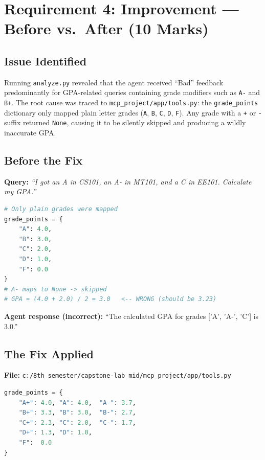 \documentclass[12pt, a4paper]{report}
\begin{document}
\section{Requirement 4: Improvement --- Before vs.\ After (10 Marks)}\label{sec:improvement}

\subsection{Issue Identified}

Running \texttt{analyze.py} revealed that the agent received ``Bad'' feedback predominantly for GPA-related queries containing grade modifiers such as \texttt{A-} and \texttt{B+}. The root cause was traced to \texttt{mcp\_project/app/tools.py}: the \texttt{grade\_points} dictionary only mapped plain letter grades (\texttt{A}, \texttt{B}, \texttt{C}, \texttt{D}, \texttt{F}). Any grade with a \texttt{+} or \texttt{-} suffix returned \texttt{None}, causing it to be silently skipped and producing a wildly inaccurate GPA.

\subsection{Before the Fix}

\textbf{Query:} \textit{``I got an A in CS101, an A- in MT101, and a C in EE101. Calculate my GPA.''}

\begin{lstlisting}[language=Python, caption={Broken grade\_points dictionary --- before fix}]
# Only plain grades were mapped
grade_points = {
    "A": 4.0,
    "B": 3.0,
    "C": 2.0,
    "D": 1.0,
    "F": 0.0
}
# A- maps to None -> skipped
# GPA = (4.0 + 2.0) / 2 = 3.0   <-- WRONG (should be 3.23)
\end{lstlisting}

\noindent\textbf{Agent response (incorrect):} ``The calculated GPA for grades ['A', 'A-', 'C'] is 3.0.''

\subsection{The Fix Applied}

\textbf{File:} \texttt{c:/8th semester/capstone-lab mid/mcp\_project/app/tools.py}

\begin{lstlisting}[language=Python, caption={Corrected grade\_points dictionary --- after fix}]
grade_points = {
    "A+": 4.0, "A": 4.0,  "A-": 3.7,
    "B+": 3.3, "B": 3.0,  "B-": 2.7,
    "C+": 2.3, "C": 2.0,  "C-": 1.7,
    "D+": 1.3, "D": 1.0,
    "F":  0.0
}
\end{lstlisting}
\end{document}
